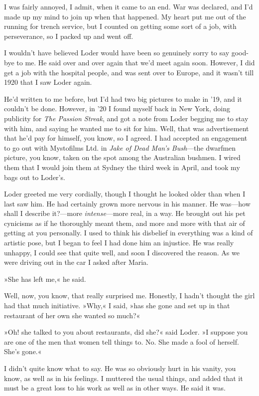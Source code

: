 I was fairly annoyed, I admit, when it came to an end. War was declared, and I'd made up my mind to join up when that happened. My heart put me out of the running for trench service, but I counted on getting some sort of a job, with perseverance, so I packed up and went off.

I wouldn't have believed Loder would have been so genuinely sorry to say good-bye to me. He said over and over again that we'd meet again soon. However, I did get a job with the hospital people, and was sent over to Europe, and it wasn't till 1920 that I saw Loder again.

He'd written to me before, but I'd had two big pictures to make in '19, and it couldn't be done. However, in '20 I found myself back in New York, doing publicity for \textit{The Passion Streak}, and got a note from Loder begging me to stay with him, and saying he wanted me to sit for him. Well, that was advertisement that he'd pay for himself, you know, so I agreed. I had accepted an engagement to go out with Mystofilms Ltd. in \textit{Jake of Dead Man's Bush}—the dwarfmen picture, you know, taken on the spot among the Australian bushmen. I wired them that I would join them at Sydney the third week in April, and took my bags out to Loder's.

Loder greeted me very cordially, though I thought he looked older than when I last saw him. He had certainly grown more nervous in his manner. He was—how shall I describe it?—more \textit{intense}—more real, in a way. He brought out his pet cynicisms as if he thoroughly meant them, and more and more with that air of getting at you personally. I used to think his disbelief in everything was a kind of artistic pose, but I began to feel I had done him an injustice. He was really unhappy, I could see that quite well, and soon I discovered the reason. As we were driving out in the car I asked after Maria.

»She has left me,« he said.

Well, now, you know, that really surprised me. Honestly, I hadn't thought the girl had that much initiative. »Why,« I said, »has she gone and set up in that restaurant of her own she wanted so much?«

»Oh! she talked to you about restaurants, did she?« said Loder. »I suppose you are one of the men that women tell things to. No. She made a fool of herself. She's gone.«

I didn't quite know what to say. He was so obviously hurt in his vanity, you know, as well as in his feelings. I muttered the usual things, and added that it must be a great loss to his work as well as in other ways. He said it was.


